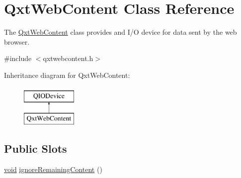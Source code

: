 \hypertarget{class_qxt_web_content}{\section{Qxt\-Web\-Content Class Reference}
\label{class_qxt_web_content}
}


The \hyperlink{class_qxt_web_content}{Qxt\-Web\-Content} class provides and I/\-O device for data sent by the web browser.  




{\ttfamily \#include $<$qxtwebcontent.\-h$>$}

Inheritance diagram for Qxt\-Web\-Content\-:\begin{figure}[H]
\begin{center}
\leavevmode
\includegraphics[height=2.000000cm]{class_qxt_web_content}
\end{center}
\end{figure}
\subsection*{Public Slots}
\begin{DoxyCompactItemize}
\item 
\hyperlink{group___u_a_v_objects_plugin_ga444cf2ff3f0ecbe028adce838d373f5c}{void} \hyperlink{class_qxt_web_content_a7f55815b734af2fb41f050bc2077e43c}{ignore\-Remaining\-Content} ()
\end{DoxyCompactItemize}
